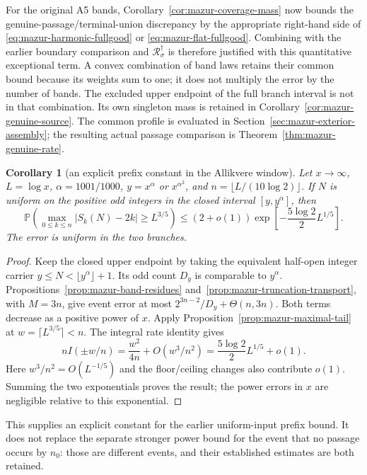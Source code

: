 \documentclass[11pt]{article}
\newtheorem{corollary}[proposition]{Corollary}
\theoremstyle{remark}\newtheorem{remark}[proposition]{Remark}
\begin{document}
For the original A5 bands, Corollary~\ref{cor:mazur-coverage-mass}
now bounds the genuine-passage/terminal-union discrepancy by the
appropriate right-hand side of
\eqref{eq:mazur-harmonic-fullgood} or
\eqref{eq:mazur-flat-fullgood}. Combining with the earlier boundary
comparison and $\mathcal R_\sigma^\dagger$ is therefore justified
with this quantitative exceptional term. A convex combination of
band laws retains their common bound because its weights sum to one;
it does not multiply the error by the number of bands.
The excluded upper endpoint of the full branch interval is not in
that combination. Its own singleton mass is retained in
Corollary~\ref{cor:mazur-genuine-source}. The common profile is evaluated
in Section~\ref{sec:mazur-exterior-assembly}; the resulting actual passage
comparison is Theorem~\ref{thm:mazur-genuine-rate}.

\begin{corollary}[an explicit prefix constant in the Allikvere window]
\label{cor:mazur-allikvere-prefix}
Let $x\to\infty$, $L=\log x$, $\alpha=1001/1000$,
$y=x^\alpha$ or $x^{\alpha^2}$, and
$n=\lfloor L/(10\log2)\rfloor$.
If $N$ is uniform on the positive odd integers in the
\emph{closed} interval $[y,y^\alpha]$, then
\begin{equation}
 \mathbb P\left(\max_{0\le k\le n}|S_k(N)-2k|\ge L^{3/5}\right)
 \le(2+o(1))\exp\left[-\frac{5\log2}{2}L^{1/5}\right].
 \label{eq:mazur-allikvere-prefix}
\end{equation}
The error is uniform in the two branches.
\end{corollary}
\begin{proof}
Keep the closed upper endpoint by taking the equivalent half-open
integer carrier $y\le N<\lfloor y^\alpha\rfloor+1$.
Its odd count $D_y$ is comparable to $y^\alpha$.
Propositions~\ref{prop:mazur-band-residues}
and~\ref{prop:mazur-truncation-transport}, with $M=3n$, give event
error at most $2^{3n-2}/D_y+\Theta(n,3n)$.
Both terms decrease as a positive power of $x$.
Apply Proposition~\ref{prop:mazur-maximal-tail} at
$w=\lceil L^{3/5}\rceil<n$. The integral rate identity gives
\[
 nI(\pm w/n)=\frac{w^2}{4n}+O(w^3/n^2)
            =\frac{5\log2}{2}L^{1/5}+o(1).
\]
Here $w^3/n^2=O(L^{-1/5})$ and the floor/ceiling changes also
contribute $o(1)$. Summing the two exponentials proves the result;
the power errors in $x$ are negligible relative to this exponential.
\end{proof}

This supplies an explicit constant for the earlier uniform-input
prefix bound. It does not replace the separate stronger power bound
for the event that no passage occurs by $n_0$: those are different
events, and their established estimates are both retained.
\end{document}
